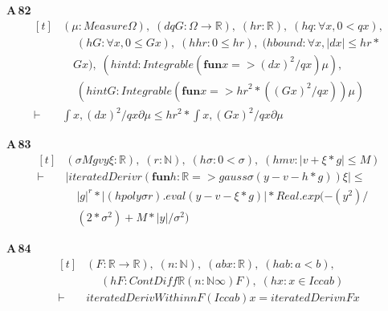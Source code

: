 \noindent\textbf{A\,82}\quad{}
{\footnotesize\[ \begin{aligned}[t]
&(\mu : \mathit{Measure} \Omega ),\; (\mathit{d} \mathit{q} \mathit{G} : \Omega \to \mathbb{R} ),\; (\mathit{hr} : \mathbb{R} ),\; (\mathit{hq} : \forall \mathit{x}, 0 < \mathit{q} \mathit{x}),\\
&\quad \; (\mathit{hG} : \forall \mathit{x}, 0 \leq \mathit{G} \mathit{x}),\; (\mathit{hhr} : 0 \leq \mathit{hr}),\; (\mathit{hbound} : \forall \mathit{x}, |\mathit{d} \mathit{x}| \leq \mathit{hr} *\\
&\quad \mathit{G} \mathit{x}),\; (\mathit{hintd} : \mathit{Integrable} (\mathbf{fun} \mathit{x} => (\mathit{d} \mathit{x}) ^{2} / \mathit{q} \mathit{x}) \mu ),\\
&\quad \; (\mathit{hintG} : \mathit{Integrable} (\mathbf{fun} \mathit{x} => \mathit{hr} ^{2} * ((\mathit{G} \mathit{x}) ^{2} / \mathit{q} \mathit{x})) \mu )\\
\vdash\;&\int \mathit{x}, (\mathit{d} \mathit{x}) ^{2} / \mathit{q} \mathit{x} ∂\mu \leq \mathit{hr} ^{2} * \int \mathit{x}, (\mathit{G} \mathit{x}) ^{2} / \mathit{q} \mathit{x} ∂\mu
\end{aligned} \]}

\noindent\textbf{A\,83}\quad{}
{\footnotesize\[ \begin{aligned}[t]
&(\sigma \mathit{M} \mathit{g} \mathit{v} \mathit{y} \xi : \mathbb{R} ),\; (\mathit{r} : \mathbb{N} ),\; (\mathit{hσ} : 0 < \sigma ),\; (\mathit{hmv} : |\mathit{v} + \xi * \mathit{g}| \leq \mathit{M})\\
\vdash\;&|\mathit{iteratedDeriv} \mathit{r} (\mathbf{fun} \mathit{h} : \mathbb{R} => \mathit{gauss} \sigma (\mathit{y} - \mathit{v} - \mathit{h} * \mathit{g})) \xi | \leq\\
&\quad |\mathit{g}| ^{\mathit{r}} * |(\mathit{hpoly} \sigma \mathit{r}).\mathit{eval} (\mathit{y} - \mathit{v} - \xi * \mathit{g})| * \mathit{Real}.\mathit{exp} (-(\mathit{y} ^{2}) /\\
&\quad (2 * \sigma ^{2}) + \mathit{M} * |\mathit{y}| / \sigma ^{2})
\end{aligned} \]}

\noindent\textbf{A\,84}\quad{}
{\footnotesize\[ \begin{aligned}[t]
&(\mathit{F} : \mathbb{R} \to \mathbb{R} ),\; (\mathit{n} : \mathbb{N} ),\; (\mathit{a} \mathit{b} \mathit{x} : \mathbb{R} ),\; (\mathit{hab} : \mathit{a} < \mathit{b}),\\
&\quad \; (\mathit{hF} : \mathit{ContDiff} \mathbb{R} (\mathit{n} : \mathbb{N} \infty ) \mathit{F}),\; (\mathit{hx} : \mathit{x} \in \mathit{Icc} \mathit{a} \mathit{b})\\
\vdash\;&\mathit{iteratedDerivWithin} \mathit{n} \mathit{F} (\mathit{Icc} \mathit{a} \mathit{b}) \mathit{x} = \mathit{iteratedDeriv} \mathit{n} \mathit{F} \mathit{x}
\end{aligned} \]}

